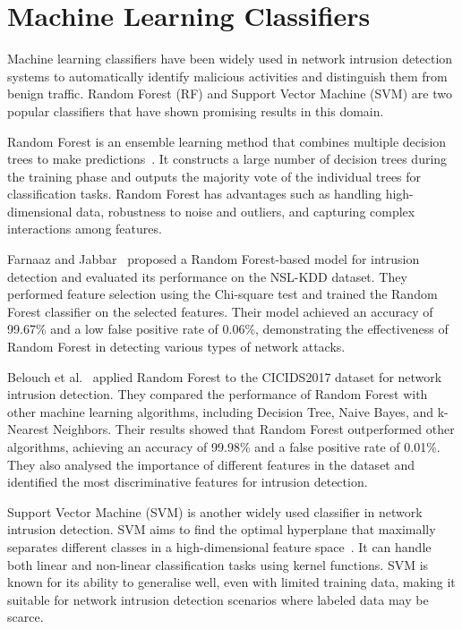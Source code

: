\section{Machine Learning Classifiers}\label{sec:classifiers}

Machine learning classifiers have been widely used in network intrusion detection systems to automatically identify malicious activities and distinguish them from benign traffic. Random Forest (RF) and Support Vector Machine (SVM) are two popular classifiers that have shown promising results in this domain.

Random Forest is an ensemble learning method that combines multiple decision trees to make predictions~\cite{hastie2009random}. It constructs a large number of decision trees during the training phase and outputs the majority vote of the individual trees for classification tasks. Random Forest has advantages such as handling high-dimensional data, robustness to noise and outliers, and capturing complex interactions among features.

Farnaaz and Jabbar~\cite{farnaaz2016random} proposed a Random Forest-based model for intrusion detection and evaluated its performance on the NSL-KDD dataset. They performed feature selection using the Chi-square test and trained the Random Forest classifier on the selected features. Their model achieved an accuracy of 99.67\% and a low false positive rate of 0.06\%, demonstrating the effectiveness of Random Forest in detecting various types of network attacks.

Belouch et al.~\cite{belouch2018performance} applied Random Forest to the CICIDS2017 dataset for network intrusion detection. They compared the performance of Random Forest with other machine learning algorithms, including Decision Tree, Naive Bayes, and k-Nearest Neighbors. Their results showed that Random Forest outperformed other algorithms, achieving an accuracy of 99.98\% and a false positive rate of 0.01\%. They also analysed the importance of different features in the dataset and identified the most discriminative features for intrusion detection.

Support Vector Machine (SVM) is another widely used classifier in network intrusion detection. SVM aims to find the optimal hyperplane that maximally separates different classes in a high-dimensional feature space~\cite{cortes1995support}. It can handle both linear and non-linear classification tasks using kernel functions. SVM is known for its ability to generalise well, even with limited training data, making it suitable for network intrusion detection scenarios where labeled data may be scarce.

